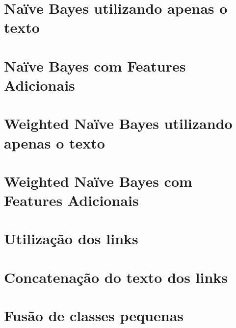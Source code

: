 

\section{Naïve Bayes utilizando apenas o texto}


\section{Naïve Bayes com Features Adicionais}


\section{Weighted Naïve Bayes utilizando apenas o texto}


\section{Weighted Naïve Bayes com Features Adicionais}


\section{Utilização dos links}
 
\section{Concatenação do texto dos links}

\section{Fusão de classes pequenas}
